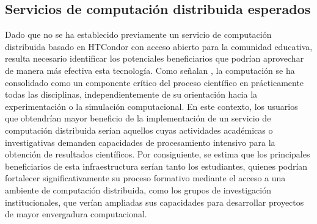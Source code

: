 \subsection{Servicios de computación distribuida esperados}
\noindent
Dado que no se ha establecido previamente un servicio de computación distribuida basado en HTCondor con acceso abierto para la comunidad educativa, resulta necesario identificar los potenciales beneficiarios que podrían aprovechar de manera más efectiva esta tecnología. Como señalan \cite{Wilson2016}, la computación se ha consolidado como un componente crítico del proceso científico en prácticamente todas las disciplinas, independientemente de su orientación hacia la experimentación o la simulación computacional. En este contexto, los usuarios que obtendrían mayor beneficio de la implementación de un servicio de computación distribuida serían aquellos cuyas actividades académicas o investigativas demanden capacidades de procesamiento intensivo para la obtención de resultados científicos. Por consiguiente, se estima que los principales beneficiarios de esta infraestructura serían tanto los estudiantes, quienes podrían fortalecer significativamente su proceso formativo mediante el acceso a una ambiente de computación distribuida, como los grupos de investigación institucionales, que verían ampliadas sus capacidades para desarrollar proyectos de mayor envergadura computacional.

